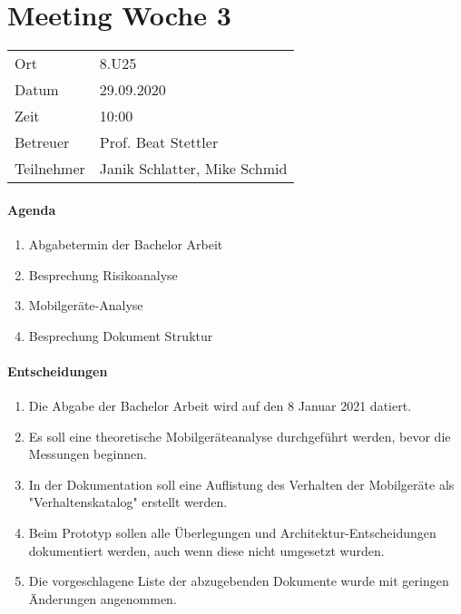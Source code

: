 \section*{Meeting Woche 3}

\begin{table}[h!]
	\begin{tabularx}{\textwidth}{l X }
		Ort & 8.U25 \\
		Datum & 29.09.2020 \\
		Zeit & 10:00 \\
		Betreuer & Prof. Beat Stettler\\
		Teilnehmer & Janik Schlatter, Mike Schmid \\
	\end{tabularx}
\end{table}

\paragraph{Agenda}
\begin{enumerate}
	\item Abgabetermin der Bachelor Arbeit
	\item Besprechung Risikoanalyse
	\item Mobilgeräte-Analyse
	\item Besprechung Dokument Struktur
\end{enumerate}

\paragraph{Entscheidungen}
\begin{enumerate}
	\item Die Abgabe der Bachelor Arbeit wird auf den 8 Januar 2021 datiert.
	\item Es soll eine theoretische Mobilgeräteanalyse durchgeführt werden, 
	bevor die Messungen beginnen.
	\item In der Dokumentation soll eine Auflistung des Verhalten der Mobilgeräte 
	als "Verhaltenskatalog" erstellt werden.
	\item Beim Prototyp sollen alle Überlegungen und Architektur-Entscheidungen 
	dokumentiert werden, auch wenn diese nicht umgesetzt wurden.
	\item Die vorgeschlagene Liste der abzugebenden Dokumente wurde mit 
	geringen Änderungen angenommen.
\end{enumerate}

\clearpage

